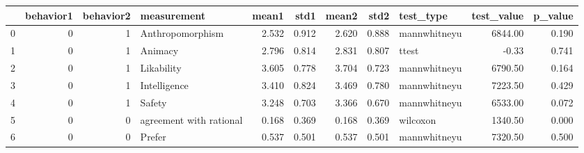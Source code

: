 \begin{tabular}{lrrlrrrrlrr}
\toprule
{} &  behavior1 &  behavior2 &              measurement &  mean1 &   std1 &  mean2 &   std2 &     test\_type &  test\_value &  p\_value \\
\midrule
0 &          0 &          1 &         Anthropomorphism &  2.532 &  0.912 &  2.620 &  0.888 &  mannwhitneyu &     6844.00 &    0.190 \\
1 &          0 &          1 &                  Animacy &  2.796 &  0.814 &  2.831 &  0.807 &         ttest &       -0.33 &    0.741 \\
2 &          0 &          1 &               Likability &  3.605 &  0.778 &  3.704 &  0.723 &  mannwhitneyu &     6790.50 &    0.164 \\
3 &          0 &          1 &             Intelligence &  3.410 &  0.824 &  3.469 &  0.780 &  mannwhitneyu &     7223.50 &    0.429 \\
4 &          0 &          1 &                   Safety &  3.248 &  0.703 &  3.366 &  0.670 &  mannwhitneyu &     6533.00 &    0.072 \\
5 &          0 &          0 &  agreement with rational &  0.168 &  0.369 &  0.168 &  0.369 &      wilcoxon &     1340.50 &    0.000 \\
6 &          0 &          0 &                   Prefer &  0.537 &  0.501 &  0.537 &  0.501 &  mannwhitneyu &     7320.50 &    0.500 \\
\bottomrule
\end{tabular}
